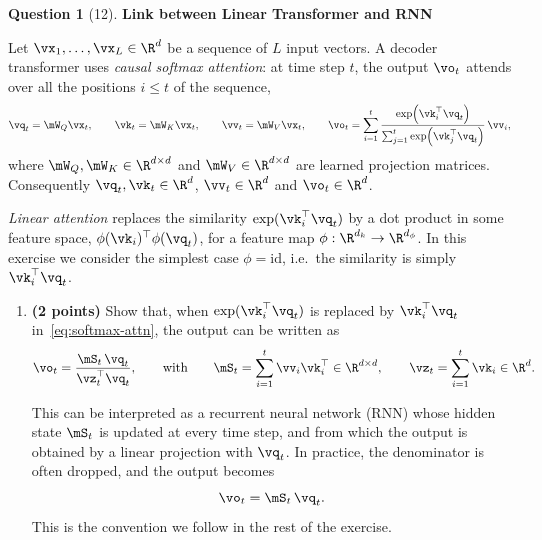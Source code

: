 \documentclass[12pt]{article}
\newif\ifexercise
\theoremstyle{definition}
\newtheorem{exercise}{Question}%
\newcommand{\Exercise}[1]{
\ifexercise#1\fi
}
\newif\ifexercise
\begin{document}
\begin{exercise}[12] \textbf{Link between Linear Transformer and RNN}
\Exercise{\label{ex:lstm}}

\noindent Let $\vx_1, \dots, \vx_L \in \R^{d}$ be a sequence of $L$ input vectors. A decoder
transformer uses \emph{causal softmax attention}: at time step $t$, the output $\vo_t$ attends
over all the positions $i \le t$ of the sequence,
\begin{equation}
    \vq_t = \mW_Q \vx_t, \qquad \vk_t = \mW_K \vx_t, \qquad \vv_t = \mW_V \vx_t, \qquad
    \vo_t = \sum_{i=1}^{t} \frac{\exp\!\left(\vk_i^\top \vq_t\right)}{\sum_{j=1}^{t} \exp\!\left(\vk_j^\top \vq_t\right)}\, \vv_i,
    \label{eq:softmax-attn}
\end{equation}
where $\mW_Q, \mW_K \in \R^{d \times d}$ and $\mW_V \in \R^{d \times d}$ are learned
projection matrices. Consequently $\vq_t, \vk_t \in \R^{d}$, $\vv_t \in \R^{d}$ and
$\vo_t \in \R^{d}$.

\noindent \emph{Linear attention} replaces the similarity $\exp(\vk_i^\top \vq_t)$ by a dot
product in some feature space, $\phi(\vk_i)^\top \phi(\vq_t)$, for a feature map
$\phi : \R^{d_k} \to \R^{d_\phi}$. In this exercise we consider the simplest case
$\phi = \mathrm{id}$, i.e.\ the similarity is simply $\vk_i^\top \vq_t$.

\begin{enumerate}[label=\textbf{\arabic*.}, leftmargin=*]

\item \textbf{(2 points)} Show that, when $\exp(\vk_i^\top \vq_t)$ is replaced by
$\vk_i^\top \vq_t$ in~\eqref{eq:softmax-attn}, the output can be written as
\begin{equation}
    \vo_t = \frac{\mS_t\, \vq_t}{\vz_t^\top \vq_t},
    \qquad \text{with} \qquad
    \mS_t = \sum_{i=1}^{t} \vv_i \vk_i^\top \in \R^{d \times d},
    \qquad
    \vz_t = \sum_{i=1}^{t} \vk_i \in \R^{d}.
    \label{eq:linear-attn}
\end{equation}

\noindent This can be interpreted as a recurrent neural network (RNN) whose hidden state
$\mS_t$ is updated at every time step, and from which the output is obtained by a linear
projection with $\vq_t$. In practice, the denominator is often dropped, and the output
becomes
\begin{equation}
    \vo_t = \mS_t\, \vq_t.
    \label{eq:linear-rnn}
\end{equation}
This is the convention we follow in the rest of the exercise.


\end{enumerate}
\end{exercise}
\end{document}
